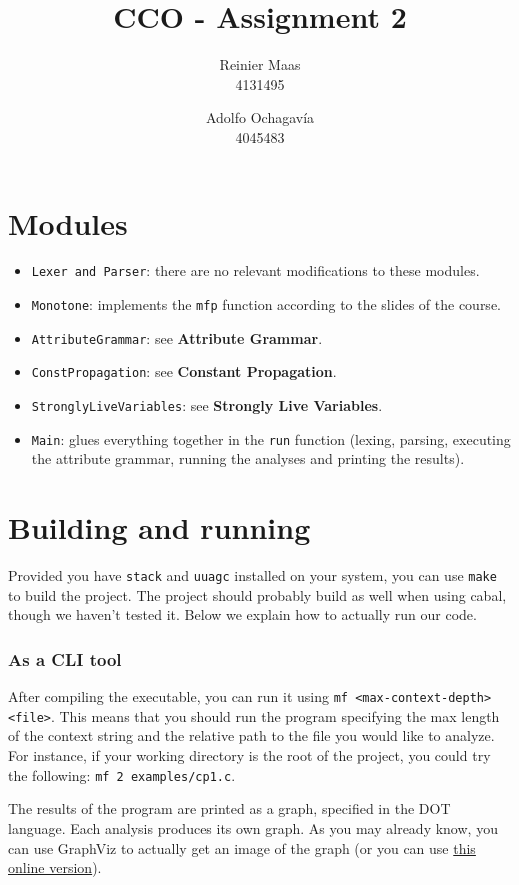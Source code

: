 \documentclass{article}
\author{
  Reinier Maas \\ 4131495
  \and
  Adolfo Ochagavía \\ 4045483
}
\title{CCO - Assignment 2}
\begin{document}
\maketitle

\section*{Modules}

\begin{itemize}
\item \texttt{Lexer and Parser}: there are no relevant modifications to these modules.
\item \texttt{Monotone}: implements the \texttt{mfp} function according to the slides of the course.
\item \texttt{AttributeGrammar}: see \textbf{Attribute Grammar}.
\item \texttt{ConstPropagation}: see \textbf{Constant Propagation}.
\item \texttt{StronglyLiveVariables}: see \textbf{Strongly Live Variables}.
\item \texttt{Main}: glues everything together in the \texttt{run} function (lexing, parsing, executing the attribute grammar, running the analyses and printing the results).
\end{itemize}

\section*{Building and running}

Provided you have \texttt{stack} and \texttt{uuagc} installed on your system, you can use \texttt{make} to build the project. The project should probably build as well when using cabal, though we haven't tested it. Below we explain how to actually run our code.

\subsubsection*{As a CLI tool}

After compiling the executable, you can run it using \texttt{mf <max-context-depth> <file>}. This means that you should run the program specifying the max length of the context string and the relative path to the file you would like to analyze. For instance, if your working directory is the root of the project, you could try the following: \texttt{mf 2 examples/cp1.c}.

The results of the program are printed as a graph, specified in the DOT language. Each analysis produces its own graph. As you may already know, you can use GraphViz to actually get an image of the graph (or you can use \href{http://www.webgraphviz.com/}{this online version}).
\end{document}
